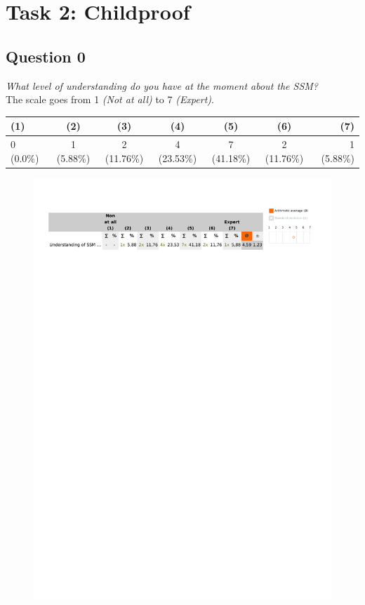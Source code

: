 \section{Task 2: Childproof} %
\label{sec:res_childproof_task}

\subsection{Question 0}
\emph{What level of understanding do you have at the moment about the SSM?}\\

The scale goes from 1 \emph{(Not at all)} to 7 \emph{(Expert)}.
\begin{table}[H]
	\begin{center}
		\small \begin{tabular*}{1.15\columnwidth}{lcccccr}
			\\ \hline \hline
			(1) & (2) & (3) & (4) & (5) & (6) & (7) \\ \hline \hline

		 	0 (0.0\%) & 1 (5.88\%) & 2 (11.76\%) & 4 (23.53\%) & 7 (41.18\%) & 2 (11.76\%) & 1 (5.88\%)\\ \hline
		\end{tabular*}
	\end{center}
\end{table}

\begin{figure}[H]
	\centering
	\includegraphics[width=0.6\linewidth]{gfx/Chapter_EvaluationResults/ChildproofTask/question0}
\end{figure}

